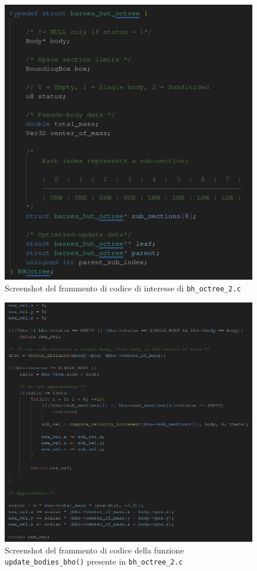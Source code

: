 \documentclass[12pt]{report}
\begin{document}
    \begin{figure}[H]
        \centering
        \includegraphics[width=\textwidth]{images/bhoctree_2.png}
        \caption{Screenshot del frammento di codice di interesse di \texttt{bh\_octree\_2.c}}
        \label{fig:bhoctree_2}
    \end{figure}

    \begin{figure}[H]
        \centering
        \includegraphics[width=\textwidth]{images/velocities.png}
        \caption{Screenshot del frammento di codice della funzione \texttt{update\_bodies\_bho()} presente in \texttt{bh\_octree\_2.c}}
        \label{fig:update_bodies}
    \end{figure}
\end{document}
